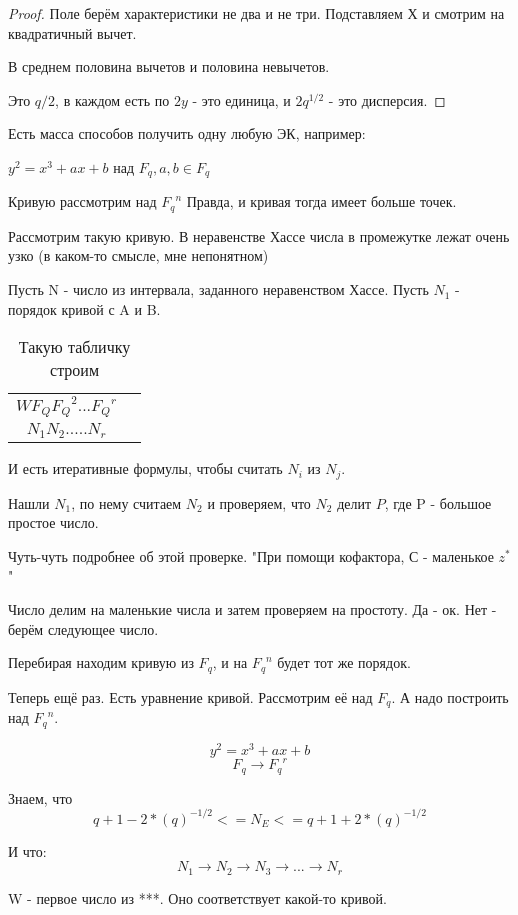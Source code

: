 \begin{proof}
Поле берём характеристики не два и не три. Подставляем Х и смотрим на квадратичный вычет. 

В среднем половина вычетов и половина невычетов. 

Это $q/2$, в каждом есть по $2y$ - это единица, и $2q^{1/2}$ - это дисперсия.

\end{proof}

Есть масса способов получить одну любую ЭК, например:

$y^2 = x^3 + ax + b$ над $F_q, a,b \in F_q$

Кривую рассмотрим над ${F_q}^n$
Правда, и кривая тогда имеет больше точек. 

Рассмотрим такую кривую. В неравенстве Хассе числа в промежутке лежат очень узко (в каком-то смысле, мне непонятном)

Пусть N - число из интервала, заданного неравенством Хассе. 
Пусть $N_1$ - порядок кривой с A и B.

\begin{table}[]
    \centering
    \begin{tabular}{c|c}
        $W F_Q {F_Q}^2 ... {F_Q}^r$ \\
        $   N_1 N_2 .....N_r$
    \end{tabular}
    \caption{Такую табличку строим}
    \label{tab:my_label}
\end{table}

И есть итеративные формулы, чтобы считать $N_i$ из $N_j$.

Нашли $N_1$, по нему считаем $N_2$ и проверяем, что $N_2$ делит $P$, где P - большое простое число.

Чуть-чуть подробнее об этой проверке. "При помощи кофактора, С - маленькое $z^*$"

Число делим на маленькие числа и затем проверяем на простоту. 
Да - ок. 
Нет - берём следующее число. 

Перебирая находим кривую из $F_q$, и на ${F_q}^n$ будет тот же порядок. 

Теперь ещё раз. Есть уравнение кривой. Рассмотрим её над $F_q$. А надо построить над ${F_q}^n$. 

$$y^2 = x^3 + ax + b$$
$$F_q \to {F_q}^r$$

Знаем, что 
$$ q+1-2*(q)^{-1/2}<=N_E<=q+1+2*(q)^{-1/2} $$

И что:
$$N_1 \to N_2 \to N_3 \to ... \to N_r$$

W - первое число из ***. Оно соответствует какой-то кривой. 

